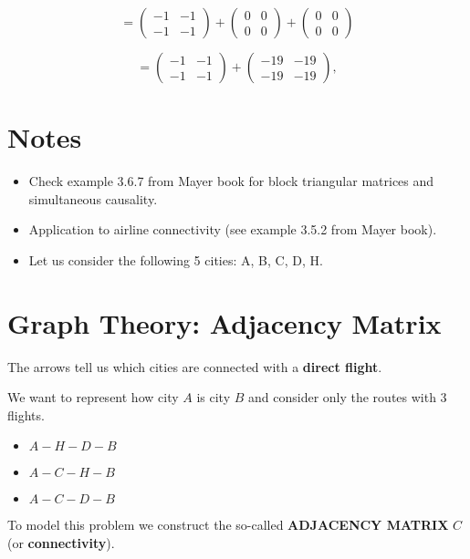 \documentclass[a4paper, 12pt]{article}
\begin{document}
\[
= \begin{pmatrix}
-1 & -1 \\
-1 & -1
\end{pmatrix}
+ \begin{pmatrix}
0 & 0 \\
0 & 0
\end{pmatrix}
+ \begin{pmatrix}
0 & 0 \\
0 & 0
\end{pmatrix}
\]

\[
= \begin{pmatrix}
-1 & -1 \\
-1 & -1
\end{pmatrix}
+ \begin{pmatrix}
-19 & -19 \\
-19 & -19
\end{pmatrix},
\]

\section*{Notes}
\begin{itemize}
\item Check example 3.6.7 from Mayer book for block triangular matrices and simultaneous causality.
\item Application to airline connectivity (see example 3.5.2 from Mayer book).
\item Let us consider the following 5 cities: A, B, C, D, H.
\end{itemize}

\section{Graph Theory: Adjacency Matrix}
\author{Anonymous}



The arrows tell us which cities are connected with a \textbf{direct flight}.

We want to represent how city $A$ is city $B$ and consider only the routes with 3 flights.

\begin{itemize}
    \item $A - H - D - B$
    \item $A - C - H - B$
    \item $A - C - D - B$
\end{itemize}

To model this problem we construct the so-called \textbf{ADJACENCY MATRIX} $C$ (or \textbf{connectivity}).
\end{document}
